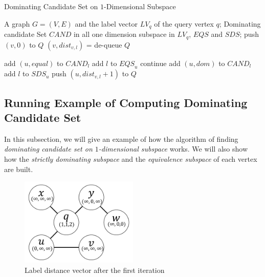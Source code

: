 \begin{algorithm}[h]
  \caption{Dominating Candidate Set on $1$-Dimensional Subspace}
  \label{algo:dom_cand_graph}
  \begin{algorithmic}[1]
  \show\LOOP
    \REQUIRE A graph $G=(V,E)$ and the label vector $LV_q$ of the query vertex $q$;
    \ENSURE Dominating candidate Set $\mathit{CAND}$ in all one dimension subspace in $LV_q$, $\mathit{EQS}$ and $\mathit{SDS}$;
            \STATE push $\left(v, 0\right)$ to $Q$
        \ENDFOR
    \ENDFOR
            \STATE $\left(v, dist_{v,l}\right)$ = de-queue $Q$
            
                \STATE add $\left(u, equal\right)$ to $\mathit{CAND}_l$
                \STATE add $l$ to $\mathit{EQS}_u$
                \STATE continue
            \ENDIF
            \STATE add $\left(u, dom\right)$ to $\mathit{CAND}_l$
            \STATE add $l$ to $\mathit{SDS}_u$
                \STATE push $\left(u, dist_{v,l}+1\right)$ to $Q$
            \ENDFOR
        \ENDFOR
    \ENDWHILE
  \end{algorithmic}
\end{algorithm}

\subsection{Running Example of Computing Dominating Candidate Set}
\label{dom:run_ex}
In this subsection, we will give an example of how the algorithm of finding \emph{dominating candidate set on $1$-dimensional subspace} works. We will also show how the \emph{strictly dominating subspace} and the \emph{equivalence subspace} of each vertex are built.

\begin{figure}[H]
    \centering
    \includegraphics[width=0.5\textwidth]{figs/graph_example_1}
    \caption{Label distance vector after the first iteration}
    \label{fig:cand_step1}
\end{figure}

